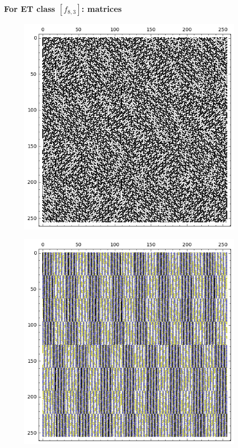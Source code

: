\documentclass[pdf,sprung,slideColor,nocolorBG]{beamer}
\begin{document}
\begin{frame}
\frametitle{For ET class $[f_{8,3}]$: matrices}
\begin{figure}
\centering
\begin{minipage}{.48\textwidth}
  \centering
  \includegraphics[width=.9\linewidth]{../matrix_plot/c8_3_weight_class_matrix.png}
  \label{fig:8_3_weight_class_matrix}
\end{minipage}%
\begin{minipage}{.48\textwidth}
  \centering
  \includegraphics[width=.9\linewidth]{../matrix_plot/c8_3_bent_cayley_graph_index_matrix.png}
  \label{fig:8_3_bent_cayley_graph_index_matrix}
\end{minipage}
\end{figure}
~
\end{frame}
\end{document}
